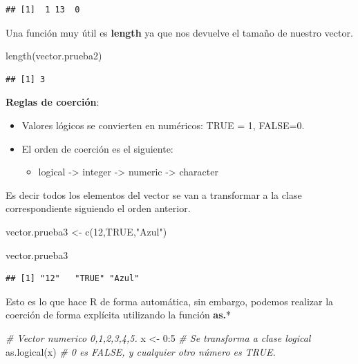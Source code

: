 \documentclass[
  12pt,
]{book}
\newenvironment{Shaded}{\begin{snugshade}}{\end{snugshade}}
\newcommand{\CommentTok}[1]{\textcolor[rgb]{0.56,0.35,0.01}{\textit{#1}}}
\newcommand{\ConstantTok}[1]{\textcolor[rgb]{0.00,0.00,0.00}{#1}}
\newcommand{\DecValTok}[1]{\textcolor[rgb]{0.00,0.00,0.81}{#1}}
\newcommand{\FunctionTok}[1]{\textcolor[rgb]{0.00,0.00,0.00}{#1}}
\newcommand{\NormalTok}[1]{#1}
\newcommand{\OtherTok}[1]{\textcolor[rgb]{0.56,0.35,0.01}{#1}}
\newcommand{\SpecialCharTok}[1]{\textcolor[rgb]{0.00,0.00,0.00}{#1}}
\newcommand{\StringTok}[1]{\textcolor[rgb]{0.31,0.60,0.02}{#1}}
\providecommand{\tightlist}{%
  \setlength{\itemsep}{0pt}\setlength{\parskip}{0pt}}
\begin{document}
\begin{verbatim}
## [1]  1 13  0
\end{verbatim}

Una función muy útil es \textbf{length} ya que nos devuelve el tamaño de nuestro vector.

\begin{Shaded}
\begin{Highlighting}[]
\FunctionTok{length}\NormalTok{(vector.prueba2)}
\end{Highlighting}
\end{Shaded}

\begin{verbatim}
## [1] 3
\end{verbatim}

\textbf{Reglas de coerción}:

\begin{itemize}
\item
  Valores lógicos se convierten en numéricos: TRUE = 1, FALSE=0.
\item
  El orden de coerción es el siguiente:

  \begin{itemize}
  \tightlist
  \item
    logical -\textgreater{} integer -\textgreater{} numeric -\textgreater{} character
  \end{itemize}
\end{itemize}

Es decir todos los elementos del vector se van a transformar a la clase correspondiente siguiendo el orden anterior.

\begin{Shaded}
\begin{Highlighting}[]
\NormalTok{vector.prueba3 }\OtherTok{\textless{}{-}} \FunctionTok{c}\NormalTok{(}\DecValTok{12}\NormalTok{,}\ConstantTok{TRUE}\NormalTok{,}\StringTok{"Azul"}\NormalTok{)}

\NormalTok{vector.prueba3}
\end{Highlighting}
\end{Shaded}

\begin{verbatim}
## [1] "12"   "TRUE" "Azul"
\end{verbatim}

Esto es lo que hace R de forma automática, sin embargo, podemos realizar la coerción de forma explícita utilizando la función \textbf{as.}*

\begin{Shaded}
\begin{Highlighting}[]
\CommentTok{\# Vector numerico 0,1,2,3,4,5.}
\NormalTok{x }\OtherTok{\textless{}{-}} \DecValTok{0}\SpecialCharTok{:}\DecValTok{5}
\CommentTok{\# Se transforma a clase logical}
\FunctionTok{as.logical}\NormalTok{(x) }\CommentTok{\# 0 es FALSE, y cualquier otro número es TRUE.}
\end{Highlighting}
\end{Shaded}
\end{document}
